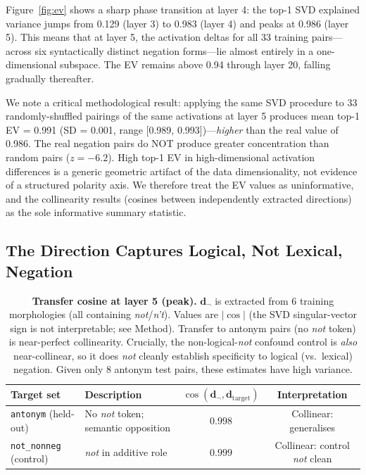 \documentclass{article}
\begin{document}
Figure~\ref{fig:ev} shows a sharp phase transition at layer 4: the top-1 SVD explained variance jumps from 0.129 (layer 3) to 0.983 (layer 4) and peaks at 0.986 (layer 5).
This means that at layer 5, the activation deltas for all 33 training pairs---across six syntactically distinct negation forms---lie almost entirely in a one-dimensional subspace.
The EV remains above 0.94 through layer 20, falling gradually thereafter.

We note a critical methodological result: applying the same SVD procedure to 33 randomly-shuffled pairings of the same activations at layer 5 produces mean top-1 EV = 0.991 (SD = 0.001, range [0.989, 0.993])---\emph{higher} than the real value of 0.986. The real negation pairs do NOT produce greater concentration than random pairs ($z = -6.2$). High top-1 EV in high-dimensional activation differences is a generic geometric artifact of the data dimensionality, not evidence of a structured polarity axis. We therefore treat the EV values as uninformative, and the collinearity results (cosines between independently extracted directions) as the sole informative summary statistic.

\subsection{The Direction Captures Logical, Not Lexical, Negation}
\label{sec:res_transfer}

\begin{table}[h]
  \centering
  \small
  \caption{\textbf{Transfer cosine at layer 5 (peak).} $\mathbf{d}_{\neg}$ is extracted from 6 training morphologies (all containing \textit{not}/\textit{n't}). Values are $|\cos|$ (the SVD singular-vector sign is not interpretable; see Method). Transfer to antonym pairs (no \textit{not} token) is near-perfect collinearity. Crucially, the non-logical-\textit{not} confound control is \emph{also} near-collinear, so it does \emph{not} cleanly establish specificity to logical (vs.\ lexical) negation. Given only 8 antonym test pairs, these estimates have high variance.}
  \label{tab:transfer}
  \begin{tabular}{llcc}
    \toprule
    Target set & Description & $\cos(\mathbf{d}_{\neg}, \mathbf{d}_{\text{target}})$ & Interpretation \\
    \midrule
    \texttt{antonym} (held-out) & No \textit{not} token; semantic opposition & $0.998$ & Collinear: generalises \\
    \texttt{not\_nonneg} (control) & \textit{not} in additive role & $0.999$ & Collinear: control \emph{not} clean \\
    \bottomrule
  \end{tabular}
\end{table}
\end{document}
